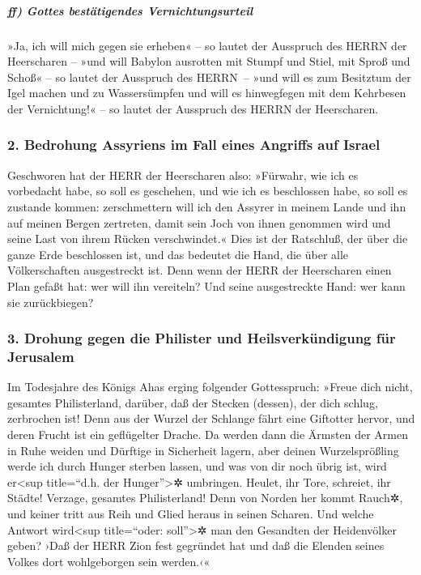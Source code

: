 \hypertarget{ff-gottes-bestuxe4tigendes-vernichtungsurteil}{%
\subparagraph{ff) Gottes bestätigendes
Vernichtungsurteil}\label{ff-gottes-bestuxe4tigendes-vernichtungsurteil}}

»Ja, ich will mich gegen sie erheben« -- so lautet der
Ausspruch des HERRN der Heerscharen -- »und will Babylon ausrotten mit
Stumpf und Stiel, mit Sproß und Schoß« -- so lautet der Ausspruch des
HERRN~-- »und will es zum Besitztum der Igel machen und
zu Wassersümpfen und will es hinwegfegen mit dem Kehrbesen der
Vernichtung!« -- so lautet der Ausspruch des HERRN der Heerscharen.

\hypertarget{bedrohung-assyriens-im-fall-eines-angriffs-auf-israel}{%
\subsubsection{2. Bedrohung Assyriens im Fall eines Angriffs auf
Israel}\label{bedrohung-assyriens-im-fall-eines-angriffs-auf-israel}}

Geschworen hat der HERR der Heerscharen also: »Fürwahr,
wie ich es vorbedacht habe, so soll es geschehen, und wie ich es
beschlossen habe, so soll es zustande kommen:
zerschmettern will ich den Assyrer in meinem Lande und
ihn auf meinen Bergen zertreten, damit sein Joch von ihnen genommen wird
und seine Last von ihrem Rücken verschwindet.« Dies ist
der Ratschluß, der über die ganze Erde beschlossen ist, und das bedeutet
die Hand, die über alle Völkerschaften ausgestreckt ist.
Denn wenn der HERR der Heerscharen einen Plan gefaßt hat:
wer will ihn vereiteln? Und seine ausgestreckte Hand: wer kann sie
zurückbiegen?

\hypertarget{drohung-gegen-die-philister-und-heilsverkuxfcndigung-fuxfcr-jerusalem}{%
\subsubsection{3. Drohung gegen die Philister und Heilsverkündigung für
Jerusalem}\label{drohung-gegen-die-philister-und-heilsverkuxfcndigung-fuxfcr-jerusalem}}

Im Todesjahre des Königs Ahas erging folgender
Gottesspruch: »Freue dich nicht, gesamtes Philisterland,
darüber, daß der Stecken (dessen), der dich schlug, zerbrochen ist! Denn
aus der Wurzel der Schlange fährt eine Giftotter hervor, und deren
Frucht ist ein geflügelter Drache. Da werden dann die
Ärmsten der Armen in Ruhe weiden und Dürftige in Sicherheit lagern, aber
deinen Wurzelsprößling werde ich durch Hunger sterben lassen, und was
von dir noch übrig ist, wird er\textless sup title=``d.h. der
Hunger''\textgreater✲ umbringen. Heulet, ihr Tore,
schreiet, ihr Städte! Verzage, gesamtes Philisterland! Denn von Norden
her kommt Rauch✲, und keiner tritt aus Reih und Glied heraus in seinen
Scharen. Und welche Antwort wird\textless sup
title=``oder: soll''\textgreater✲ man den Gesandten der Heidenvölker
geben? ›Daß der HERR Zion fest gegründet hat und daß die Elenden seines
Volkes dort wohlgeborgen sein werden.‹«

